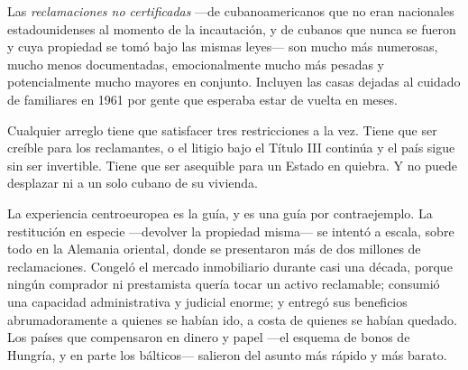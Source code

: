Las \emph{reclamaciones no certificadas} ---de cubanoamericanos que no eran nacionales
estadounidenses al momento de la incautación, y de cubanos que nunca se fueron y cuya propiedad
se tomó bajo las mismas leyes--- son mucho más numerosas, mucho menos documentadas,
emocionalmente mucho más pesadas y potencialmente mucho mayores en conjunto. Incluyen las casas
dejadas al cuidado de familiares en 1961 por gente que esperaba estar de vuelta en meses.

Cualquier arreglo tiene que satisfacer tres restricciones a la vez. Tiene que ser creíble para
los reclamantes, o el litigio bajo el Título III continúa y el país sigue sin ser invertible.
Tiene que ser asequible para un Estado en quiebra. Y no puede desplazar ni a un solo cubano de
su vivienda.

La experiencia centroeuropea es la guía, y es una guía por contraejemplo. La restitución en
especie ---devolver la propiedad misma--- se intentó a escala, sobre todo en la Alemania
oriental, donde se presentaron más de dos millones de reclamaciones. Congeló el mercado
inmobiliario durante casi una década, porque ningún comprador ni prestamista quería tocar un
activo reclamable; consumió una capacidad administrativa y judicial enorme; y entregó sus
beneficios abrumadoramente a quienes se habían ido, a costa de quienes se habían quedado. Los
países que compensaron en dinero y papel ---el esquema de bonos de Hungría, y en parte los
bálticos--- salieron del asunto más rápido y más barato.


